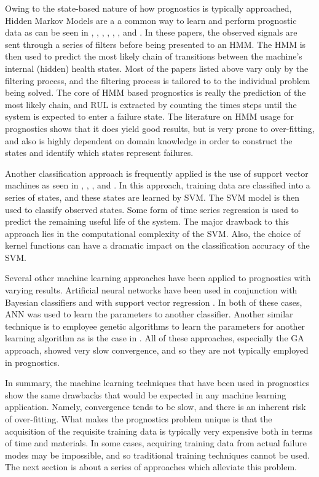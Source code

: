 \documentclass[12pt]{article}
\begin{document}
Owing to the state-based nature of how prognostics is typically
approached, Hidden Markov Models are a a common way to learn and
perform prognostic data as can be seen in \cite{6246315},
\cite{6190767}, \cite{6023116}, \cite{6228954}, \cite{5414580},
\cite{5262871}, and \cite{1241660}. In these papers, the observed
signals are sent through a series of filters before being presented to
an HMM. The HMM is then used to predict the most likely chain of
transitions between the machine's internal (hidden) health states.
Most of the papers listed above vary only by the filtering process,
and the filtering process is tailored to to the individual problem
being solved. The core of HMM based prognostics is really the
prediction of the most likely chain, and RUL is extracted by counting
the times steps until the system is expected to enter a failure
state. The literature on HMM usage for prognostics shows that it does
yield good results, but is very prone to over-fitting, and also is
highly dependent on domain knowledge in order to construct the states
and identify which states represent failures.

Another classification approach is frequently applied is the use of
support vector machines as seen in \cite{6299511}, \cite{6299512},
\cite{6228843}, and \cite{5939470}.  In this approach, training data
are classified into a series of states, and these states are learned
by SVM.  The SVM model is then used to classify observed states.  Some
form of time series regression is used to predict the remaining useful
life of the system.  The major drawback to this approach lies in the
computational complexity of the SVM.  Also, the choice of kernel
functions can have a dramatic impact on the classification accuracy of
the SVM.

Several other machine learning approaches have been applied to
prognostics with varying results.  Artificial neural networks have
been used in conjunction with Bayesian classifiers \cite{4350749} and
with support vector regression \cite{5939530}.  In both of these
cases, ANN was used to learn the parameters to another classifier.
Another similar technique is to employee genetic algorithms to learn
the parameters for another learning algorithm as is the case in
\cite{4350749}.  All of these approaches, especially the GA approach,
showed very slow convergence, and so they are not typically employed
in prognostics.

In summary, the machine learning techniques that have been used in
prognostics show the same drawbacks that would be expected in any
machine learning application.  Namely, convergence tends to be slow,
and there is an inherent risk of over-fitting.  What makes the
prognostics problem unique is that the acquisition of the requisite
training data is typically very expensive both in terms of time and
materials.  In some cases, acquiring training data from actual failure
modes may be impossible, and so traditional training techniques cannot
be used.  The next section is about a series of approaches which
alleviate this problem.
\end{document}
